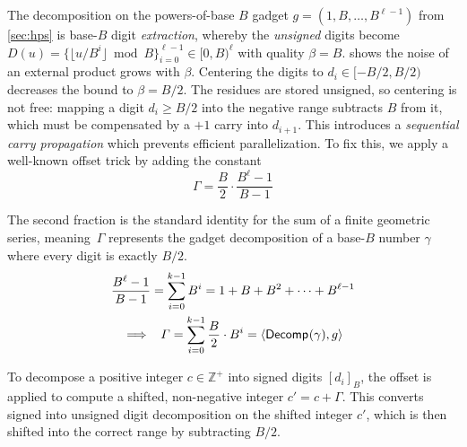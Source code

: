 The decomposition on the powers-of-base $B$ gadget $g=(1, B, \dots, B^{\ell-1})$ from \cref{sec:hps} is base-$B$ digit \emph{extraction}, whereby the \emph{unsigned} digits become $D(u) = \{\lfloor u/B^{i} \rfloor \bmod{B}\}_{i=0}^{\ell-1} \in [0, B)^{\ell}$ with quality $\beta=B$.  shows the noise of an external product grows with $\beta$. Centering the digits to $d_i \in [-B/2, B/2)$ decreases the bound to $\beta=B/2$. %
The residues are stored unsigned, so centering is not free: mapping a digit $d_i \geq B/2$ into the negative range subtracts $B$ from it, which must be compensated by a $+1$ carry into $d_{i+1}$. This introduces a \emph{sequential carry propagation} which prevents efficient parallelization. To fix this, we apply a well-known offset trick by adding the constant
\begin{equation}
    \label{eq:carry-offset}
    \varGamma = \frac{B}{2}\cdot\frac{B^{\ell} - 1}{B - 1}
\end{equation}

The second fraction is the standard identity for the sum of a finite geometric series, meaning~$\varGamma$ represents the gadget decomposition of a base-$B$ number $\gamma$ where every digit is exactly $B/2$.
\begin{gather*}
    \frac{B^{\ell} - 1}{B - 1} = \sum_{i=0}^{k-1} B^i = 1 + B + B^2 + \dots + B^{\ell - 1} \\
    \implies\;\; \varGamma = \sum_{i=0}^{k-1}\frac{B}{2}\cdot B^i = \langle \mathsf{Decomp}^{}(\gamma), g \rangle
\end{gather*}

To decompose a positive integer $c \in \mathbb{Z}^{+}$ into signed digits $[d_i]_{B}$, the offset is applied to compute a shifted, non-negative integer $c' = c + \varGamma$. This converts signed into unsigned digit decomposition on the shifted integer $c'$, which is then shifted into the correct range by subtracting $B/2$.


